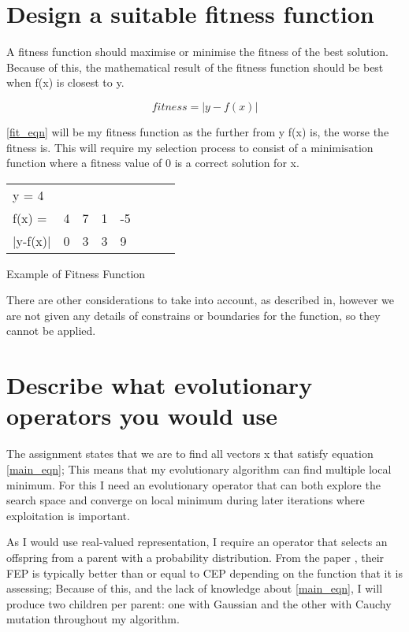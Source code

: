 \documentclass{article}
\begin{document}
\section{Design a suitable fitness function}

A fitness function should maximise or minimise the fitness of the best solution. Because of this, the mathematical result of the fitness function should be best when f(x) is closest to y.

\begin{equation} \label{fit_eqn}
fitness = |y - f(x)|
\end{equation}

\ref{fit_eqn} will be my fitness function as the further from y f(x) is, the worse the fitness is. This will require my selection process to consist of a minimisation function where a fitness value of 0 is a correct solution for x.

\bigbreak

\begin{tabular}{*8l}
y = 4           &        &      &     	&	\\
f(x) =          &4       &7     &1	&-5    	\\
$|$y-f(x)$|$        &0       &3     &3    	&9	\\

\end{tabular}
\smallbreak
Example of Fitness Function

\bigbreak
There are other considerations to take into account, as described in\cite{fitness}, however we are not given any details of constrains or boundaries for the function, so they cannot be applied.


\section{Describe what evolutionary operators you would use}
\label{evo_op1}
The assignment states that we are to find all vectors x that satisfy equation \ref{main_eqn}; This means that my evolutionary algorithm can find multiple local minimum. For this I need an evolutionary operator that can both explore the search space and converge on local minimum during later iterations where exploitation is important.

As I would use real-valued representation, I require an operator that selects an offspring from a parent with a probability distribution. From the paper \cite{faster}, their FEP is typically better than or equal to CEP depending on the function that it is assessing; Because of this, and the lack of knowledge about \ref{main_eqn}, I will produce two children per parent: one with Gaussian and the other with Cauchy mutation throughout my algorithm. 
\end{document}
